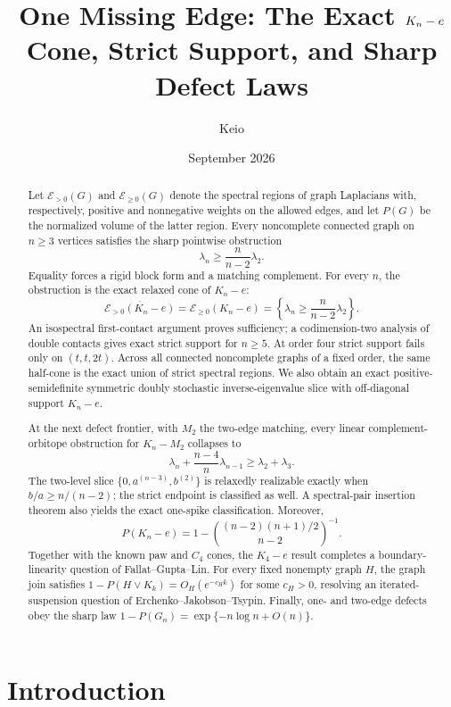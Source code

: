 \documentclass[11pt,reqno]{amsart}
\title[One Missing Edge]{One Missing Edge: The Exact
  \texorpdfstring{$K_n-\lowercase{e}$}{Kn-e} Cone, Strict Support,
  and Sharp Defect Laws}
\author{Keio}
\date{September 2026}
\theoremstyle{definition}
\theoremstyle{remark}
\begin{document}
\begin{abstract}
Let $\mathcal E_{>0}(G)$ and $\mathcal E_{\ge0}(G)$ denote the spectral
regions of graph Laplacians with, respectively, positive and nonnegative
weights on the allowed edges, and let $P(G)$ be the normalized volume of the
latter region.  Every noncomplete connected graph on $n\ge3$ vertices
satisfies the sharp pointwise obstruction
\[
  \lambda_n\ge \frac{n}{n-2}\lambda_2.
\]
Equality forces a rigid block form and a matching complement.  For every
$n$, the obstruction is the exact relaxed cone of $K_n-e$:
\[
  \overline{\mathcal E_{>0}(K_n-e)}
  =\mathcal E_{\ge0}(K_n-e)
  =\left\{\lambda_n\ge\frac{n}{n-2}\lambda_2\right\}.
\]
An isospectral first-contact argument proves sufficiency; a codimension-two
analysis of double contacts gives exact strict support for $n\ge5$.  At
order four strict support fails only on $(t,t,2t)$.  Across all connected
noncomplete graphs of a fixed order, the same half-cone is the exact union of
strict spectral regions.  We also obtain an exact positive-semidefinite
symmetric doubly stochastic inverse-eigenvalue slice with off-diagonal
support $K_n-e$.

At the next defect frontier, with $M_2$ the two-edge matching, every linear
complement-orbitope obstruction for $K_n-M_2$ collapses to
\[
 \lambda_n+\frac{n-4}{n}\lambda_{n-1}\ge\lambda_2+\lambda_3.
\]
The two-level slice $\{0,a^{(n-3)},b^{(2)}\}$ is relaxedly realizable exactly
when $b/a\ge n/(n-2)$; the strict endpoint is classified as well.  A
spectral-pair insertion theorem also yields the exact one-spike
classification.  Moreover,
\[
  P(K_n-e)=1-
  \binom{(n-2)(n+1)/2}{n-2}^{-1}.
\]
Together with the known paw and $C_4$ cones, the $K_4-e$ result completes a
boundary-linearity question of Fallat--Gupta--Lin.  For every fixed nonempty
graph $H$, the graph join satisfies $1-P(H\vee K_k)=O_H(e^{-c_Hk})$ for some
$c_H>0$, resolving an iterated-suspension question of
Erchenko--Jakobson--Tsypin.  Finally, one- and two-edge defects obey the sharp
law $1-P(G_n)=\exp\{-n\log n+O(n)\}$.
\end{abstract}

\maketitle

\section{Introduction}
\end{document}
